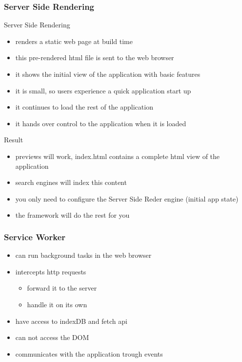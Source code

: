 \begin{frame}[fragile] \frametitle{Server Side Rendering}
Server Side Rendering
\begin{itemize}
  \item renders a static web page at build time
  \item this pre-rendered html file is sent to the web browser
  \item it shows the initial view of the application with basic features
  \item it is small, so users experience a quick application start up
  \item it continues to load the rest of the application
  \item it hands over control to the application when it is loaded
\end{itemize}
Result
\begin{itemize}
  \item previews will work, index.html contains a complete html view of the application
  \item search engines will index this content
  \item you only need to configure the Server Side Reder engine (initial app state)
  \item the framework will do the rest for you
\end{itemize}
\end{frame}

\begin{frame}[fragile] \frametitle{Service Worker}
\begin{itemize}
  \item can run background tasks in the web browser
  \item intercepts http requests
  \begin{itemize}
    \item forward it to the server
    \item handle it on its own
  \end{itemize}
  \item have access to indexDB and fetch api
  \item can not access the DOM
  \item communicates with the application trough events
\end{itemize}
\end{frame}

